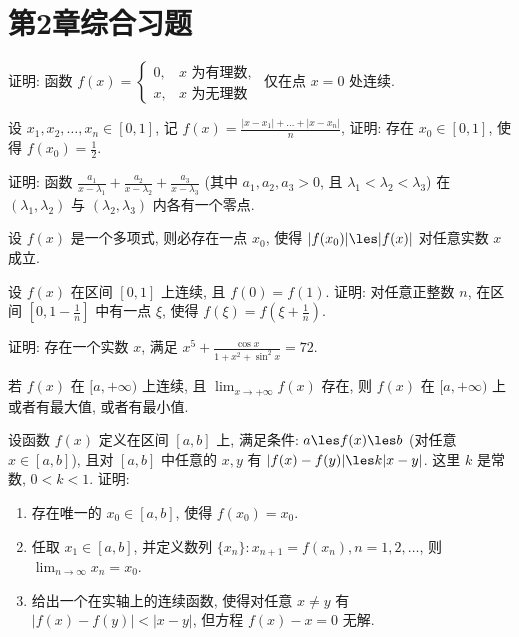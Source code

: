 \section{第2章综合习题}

\begin{exercise}[2.C.1]
    证明: 函数 $f(x) = \begin{cases} 0, & x \text{ 为有理数}, \\ x, & x \text{ 为无理数} \end{cases}$ 仅在点 $x=0$ 处连续.
\end{exercise}



\begin{exercise}[2.C.2]
    设 $x_1, x_2, \dots, x_n \in [0,1]$, 记 $f(x) = \frac{|x-x_1|+\dots+|x-x_n|}{n}$, 证明: 存在 $x_0 \in [0,1]$, 使得 $f(x_0) = \frac{1}{2}$.
\end{exercise}

\begin{exercise}[2.C.3]
    证明: 函数 $\frac{a_1}{x-\lambda_1} + \frac{a_2}{x-\lambda_2} + \frac{a_3}{x-\lambda_3}$ (其中 $a_1, a_2, a_3 > 0$, 且 $\lambda_1 < \lambda_2 < \lambda_3$) 在 $(\lambda_1, \lambda_2)$ 与 $(\lambda_2, \lambda_3)$ 内各有一个零点.
\end{exercise}

\begin{exercise}[2.C.4]
    设 $f(x)$ 是一个多项式, 则必存在一点 $x_0$, 使得 $|f(x_0)| \les |f(x)|$ 对任意实数 $x$ 成立.
\end{exercise}

\begin{exercise}[2.C.5]
    设 $f(x)$ 在区间 $[0,1]$ 上连续, 且 $f(0)=f(1)$. 证明: 对任意正整数 $n$, 在区间 $[0, 1-\frac{1}{n}]$ 中有一点 $\xi$, 使得 $f(\xi) = f(\xi+\frac{1}{n})$.
\end{exercise}

\begin{exercise}[2.C.6]
    证明: 存在一个实数 $x$, 满足 $x^5 + \frac{\cos x}{1+x^2+\sin^2 x} = 72$.
\end{exercise}

\begin{exercise}[2.C.7]
    若 $f(x)$ 在 $[a, +\infty)$ 上连续, 且 $\lim_{x \to +\infty} f(x)$ 存在, 则 $f(x)$ 在 $[a, +\infty)$ 上或者有最大值, 或者有最小值.
\end{exercise}

\begin{exercise}[2.C.8]
    设函数 $f(x)$ 定义在区间 $[a,b]$ 上, 满足条件: $a \les f(x) \les b$ (对任意 $x \in [a,b]$), 且对 $[a,b]$ 中任意的 $x,y$ 有 $|f(x)-f(y)| \les k|x-y|$. 这里 $k$ 是常数, $0<k<1$. 证明:
    \begin{enumerate}
        \item 存在唯一的 $x_0 \in [a,b]$, 使得 $f(x_0)=x_0$.
        \item 任取 $x_1 \in [a,b]$, 并定义数列 $\{x_n\}: x_{n+1} = f(x_n), n=1,2,\dots$, 则 $\lim_{n \to \infty} x_n = x_0$.
        \item 给出一个在实轴上的连续函数, 使得对任意 $x \ne y$ 有 $|f(x)-f(y)| < |x-y|$, 但方程 $f(x)-x=0$ 无解.
    \end{enumerate}
\end{exercise}

